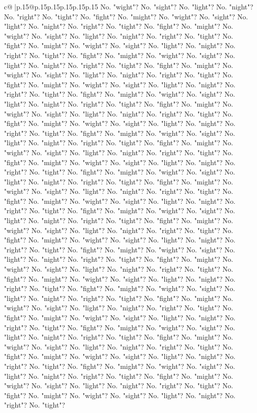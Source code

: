 \documentclass{article}
\begin{document}
{\begin{supertabular}{c@{$\;$}|p{.15\linewidth}@{}p{.15\linewidth}p{.15\linewidth}p{.15\linewidth}p{.15\linewidth}p{.15\linewidth}}
{{{No. "wight"? No. "sight"? No. "light"? No. "night"? No. "right"? No. "tight"? No. "fight"? No. "might"? No. "wight"? No. "sight"? No. "light"? No. "night"? No. "right"? No. "tight"? No. "fight"? No. "might"? No. "wight"? No. "sight"? No. "light"? No. "night"? No. "right"? No. "tight"? No. "fight"? No. "might"? No. "wight"? No. "sight"? No. "light"? No. "night"? No. "right"? No. "tight"? No. "fight"? No. "might"? No. "wight"? No. "sight"? No. "light"? No. "night"? No. "right"? No. "tight"? No. "fight"? No. "might"? No. "wight"? No. "sight"? No. "light"? No. "night"? No. "right"? No. "tight"? No. "fight"? No. "might"? No. "wight"? No. "sight"? No. "light"? No. "night"? No. "right"? No. "tight"? No. "fight"? No. "might"? No. "wight"? No. "sight"? No. "light"? No. "night"? No. "right"? No. "tight"? No. "fight"? No. "might"? No. "wight"? No. "sight"? No. "light"? No. "night"? No. "right"? No. "tight"? No. "fight"? No. "might"? No. "wight"? No. "sight"? No. "light"? No. "night"? No. "right"? No. "tight"? No. "fight"? No. "might"? No. "wight"? No. "sight"? No. "light"? No. "night"? No. "right"? No. "tight"? No. "fight"? No. "might"? No. "wight"? No. "sight"? No. "light"? No. "night"? No. "right"? No. "tight"? No. "fight"? No. "might"? No. "wight"? No. "sight"? No. "light"? No. "night"? No. "right"? No. "tight"? No. "fight"? No. "might"? No. "wight"? No. "sight"? No. "light"? No. "night"? No. "right"? No. "tight"? No. "fight"? No. "might"? No. "wight"? No. "sight"? No. "light"? No. "night"? No. "right"? No. "tight"? No. "fight"? No. "might"? No. "wight"? No. "sight"? No. "light"? No. "night"? No. "right"? No. "tight"? No. "fight"? No. "might"? No. "wight"? No. "sight"? No. "light"? No. "night"? No. "right"? No. "tight"? No. "fight"? No. "might"? No. "wight"? No. "sight"? No. "light"? No. "night"? No. "right"? No. "tight"? No. "fight"? No. "might"? No. "wight"? No. "sight"? No. "light"? No. "night"? No. "right"? No. "tight"? No. "fight"? No. "might"? No. "wight"? No. "sight"? No. "light"? No. "night"? No. "right"? No. "tight"? No. "fight"? No. "might"? No. "wight"? No. "sight"? No. "light"? No. "night"? No. "right"? No. "tight"? No. "fight"? No. "might"? No. "wight"? No. "sight"? No. "light"? No. "night"? No. "right"? No. "tight"? No. "fight"? No. "might"? No. "wight"? No. "sight"? No. "light"? No. "night"? No. "right"? No. "tight"? No. "fight"? No. "might"? No. "wight"? No. "sight"? No. "light"? No. "night"? No. "right"? No. "tight"? No. "fight"? No. "might"? No. "wight"? No. "sight"? No. "light"? No. "night"? No. "right"? No. "tight"? No. "fight"? No. "might"? No. "wight"? No. "sight"? No. "light"? No. "night"? No. "right"? No. "tight"? No. "fight"? No. "might"? No. "wight"? No. "sight"? No. "light"? No. "night"? No. "right"? No. "tight"? No. "fight"? No. "might"? No. "wight"? No. "sight"? No. "light"? No. "night"? No. "right"? No. "tight"? No. "fight"? No. "might"? No. "wight"? No. "sight"? No. "light"? No. "night"? No. "right"? No. "tight"? No. "fight"? No. "might"? No. "wight"? No. "sight"? No. "light"? No. "night"? No. "right"? No. "tight"? No. "fight"? No. "might"? No. "wight"? No. "sight"? No. "light"? No. "night"? No. "right"? No. "tight"? }}}
\end{supertabular}}
\end{document}
